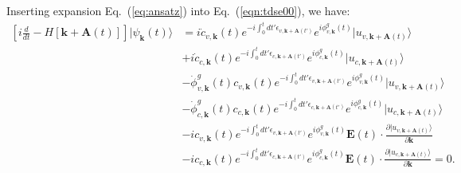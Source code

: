 Inserting expansion Eq.~(\ref{eq:ansatz}) into Eq.~(\ref{eqn:tdse00}), we have:
\begin{align}
	\left [i\frac{d}{dt}-H\left [\mathbf k + \mathbf A(t) \right ] \right ]|\psi_{\mathbf k}(t) \rangle & =
	i \dot c_{v,\mathbf k}(t) e^{-i\int^t_0dt' \epsilon_{v,\mathbf k+ \mathbf A(t')}} e^{i\phi^g_{v,\mathbf k}(t)} |u_{v,\mathbf k+\mathbf A(t)}\rangle \nonumber                                                                                                                                                          \\
	                                                                                                    & + i\dot c_{c,\mathbf k}(t) e^{-i\int^t_0dt' \epsilon_{c,\mathbf k+ \mathbf A(t')}} e^{i\phi^g_{c,\mathbf k}(t)} |u_{c,\mathbf k+\mathbf A(t)}\rangle \nonumber                                                   \\
	                                                                                                    & - \dot \phi^g_{v,\mathbf k}(t) c_{v,\mathbf k}(t) e^{-i\int^t_0dt' \epsilon_{v,\mathbf k+ \mathbf A(t')}} e^{i\phi^g_{v,\mathbf k}(t)} |u_{v,\mathbf k+\mathbf A(t)}\rangle \nonumber                            \\
	                                                                                                    & - \dot \phi^g_{c,\mathbf k}(t) c_{c,\mathbf k}(t) e^{-i\int^t_0dt' \epsilon_{c,\mathbf k+ \mathbf A(t')}} e^{i\phi^g_{c,\mathbf k}(t)} |u_{c,\mathbf k+\mathbf A(t)}\rangle \nonumber                            \\
	                                                                                                    & - i c_{v,\mathbf k}(t) e^{-i\int^t_0dt' \epsilon_{v,\mathbf k+ \mathbf A(t')}} e^{i\phi^g_{v,\mathbf k}(t)} \mathbf E(t)\cdot \frac{\partial |u_{v,\mathbf k+\mathbf A(t)}\rangle}{\partial \mathbf k} \nonumber \\
	                                                                                                    & - i c_{c,\mathbf k}(t) e^{-i\int^t_0dt' \epsilon_{c,\mathbf k+ \mathbf A(t')}} e^{i\phi^g_{c,\mathbf k}(t)} \mathbf E(t)\cdot \frac{\partial |u_{c,\mathbf k+\mathbf A(t)}\rangle}{\partial \mathbf k} = 0.
	\label{eq:tdse01}
\end{align}


